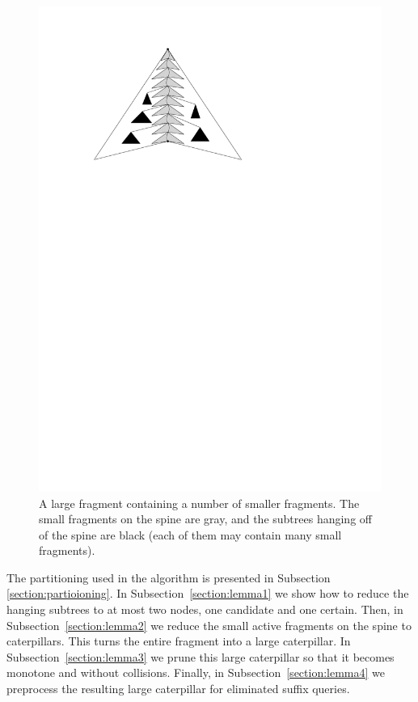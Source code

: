 \documentclass[a4paper,UKenglish]{lipics-v2016}
\theoremstyle{plain}
\begin{document}
\begin{figure}[h]
\begin{center}
\includegraphics[scale=1]{refinement}
\end{center}
\caption{A large fragment containing a number of smaller fragments. The small fragments on the spine are gray, and the subtrees hanging off of the spine are black (each of them may contain many small fragments). %
\label{figure of small fragments inside a large fragment}}
\end{figure}

\noindent The partitioning used in the algorithm is presented in Subsection \ref{section:partioioning}. In Subsection~\ref{section:lemma1} we show how to reduce the hanging subtrees to at most two nodes, one candidate and one certain. Then, in Subsection~\ref{section:lemma2} we reduce the small active fragments on the spine to caterpillars. This turns the entire fragment into a large caterpillar. In Subsection~\ref{section:lemma3} we prune this large caterpillar so that it becomes monotone and without collisions. Finally, in Subsection~\ref{section:lemma4} we preprocess the resulting large caterpillar for eliminated suffix queries. 
\end{document}
